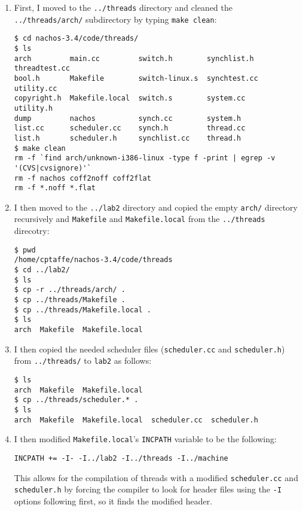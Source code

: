 \documentclass[letterpaper, 10pt]{article}
\begin{document}
	\begin{enumerate}

	\item{
	First, I moved to the {\tt ../threads} directory and cleaned the {\tt ../threads/arch/} subdirectory by typing {\tt make clean}:

	\begin{verbatim}
$ cd nachos-3.4/code/threads/
$ ls
arch         main.cc         switch.h        synchlist.h   threadtest.cc
bool.h       Makefile        switch-linux.s  synchtest.cc  utility.cc
copyright.h  Makefile.local  switch.s        system.cc     utility.h
dump         nachos          synch.cc        system.h
list.cc      scheduler.cc    synch.h         thread.cc
list.h       scheduler.h     synchlist.cc    thread.h
$ make clean
rm -f `find arch/unknown-i386-linux -type f -print | egrep -v '(CVS|cvsignore)'`
rm -f nachos coff2noff coff2flat
rm -f *.noff *.flat
	\end{verbatim}
	}

	\item{
	I then moved to the {\tt ../lab2} directory and copied the empty {\tt arch/} directory recursively and {\tt Makefile} and {\tt Makefile.local} from the {\tt ../threads} direcotry:

	\begin{verbatim}
$ pwd
/home/cptaffe/nachos-3.4/code/threads
$ cd ../lab2/
$ ls
$ cp -r ../threads/arch/ .
$ cp ../threads/Makefile .
$ cp ../threads/Makefile.local .
$ ls
arch  Makefile  Makefile.local
	\end{verbatim}
	}

	\item{
	I then copied the needed scheduler files ({\tt scheduler.cc} and {\tt scheduler.h}) from {\tt../threads/} to {\tt lab2} as follows:

	\begin{verbatim}
$ ls
arch  Makefile  Makefile.local
$ cp ../threads/scheduler.* .
$ ls
arch  Makefile  Makefile.local  scheduler.cc  scheduler.h
	\end{verbatim}
	}

	\item{
	I then modified {\tt Makefile.local}'s {\tt INCPATH} variable to be the following:

	\begin{verbatim}
INCPATH += -I- -I../lab2 -I../threads -I../machine
	\end{verbatim}

	This allows for the compilation of threads with a modified {\tt scheduler.cc} and {\tt scheduler.h} by forcing the compiler to look for header files using the {\tt -I} options following first, so it finds the modified header.

}
\end{enumerate}
\end{document}
